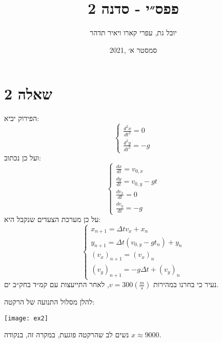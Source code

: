 \documentclass{article}
\title{פפס״י - סדנה 2}
\author{יובל גת, עפרי קארו ויאיר תדהר}
\date{2021, סמסטר א׳}
\begin{document}
	\maketitle
	\section{שאלה 2}
	הפירוק יביא:
	\[
		\begin{cases}
			\frac{d^2x}{dt^2}=0 \\
			\frac{d^2y}{dt^2}=-g
		\end{cases}
	\]
	ועל כן נכתוב:
	\[
		\begin{cases}
			\frac{dx}{dt}=v_{0, x} \\
			\frac{dy}{dt}=v_{0, y}-gt \\
			\frac{dv_x}{dt}=0 \\
			\frac{dv_y}{dt}=-g
		\end{cases}
	\]
	על כן מערכת הצעדים שנקבל היא:
	\[
		\begin{cases}
			x_{n+1}=\Delta tv_x+x_n \\
			y_{n+1}=\Delta t(v_{0, y}-gt_n)+y_n \\
			(v_x)_{n+1}=(v_x)_n \\
			(v_y)_{n+1}=-g\Delta t+(v_y)_n
		\end{cases}
	\]
	נעיר כי בחרנו במהירות
	$v=300\left(\frac{m}{s}\right)$,
	לאחר התייעצות עם קמ״ד בחק״ב ים.
	
	להלן מסלול התנועה של הרקטה:
	\begin{center}
		\texttt{[image: ex2]}
	\end{center}
	נשים לב שהרקטה פוגעת, במקרה זה, בנקודה
	$x\approx 9000$.
\end{document}
